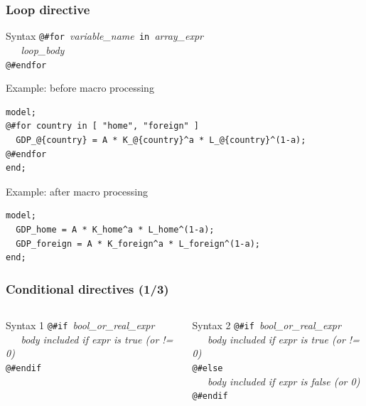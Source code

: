 \documentclass{beamer}
\begin{document}
\begin{frame}[fragile=singleslide]
  \frametitle{Loop directive}
  \begin{block}{Syntax}
\verb+@#for +\textit{variable\_name}\verb+ in +\textit{array\_expr} \\
\verb+   +\textit{loop\_body} \\
\verb+@#endfor+
  \end{block}
  \begin{block}{Example: before macro processing}
    \small
\begin{verbatim}
model;
@#for country in [ "home", "foreign" ]
  GDP_@{country} = A * K_@{country}^a * L_@{country}^(1-a);
@#endfor
end;
\end{verbatim}
    \normalsize
  \end{block}

  \begin{block}{Example: after macro processing}
    \small
\begin{verbatim}
model;
  GDP_home = A * K_home^a * L_home^(1-a);
  GDP_foreign = A * K_foreign^a * L_foreign^(1-a);
end;
\end{verbatim}
    \normalsize
  \end{block}
\end{frame}

\begin{frame}[fragile=singleslide]
  \frametitle{Conditional directives (1/3)}

  \begin{columns}[T]
    \begin{block}{Syntax 1}
\verb+@#if +\textit{bool\_or\_real\_expr} \\
\verb+   +\textit{body included if expr is true (or != 0)} \\
\verb+@#endif+
    \end{block}

    \begin{block}{Syntax 2}
\verb+@#if +\textit{bool\_or\_real\_expr} \\
\verb+   +\textit{body included if expr is true (or != 0)} \\
\verb+@#else+ \\
\verb+   +\textit{body included if expr is false (or 0)} \\
\verb+@#endif+
    \end{block}
  \end{columns}
\end{frame}
\end{document}
